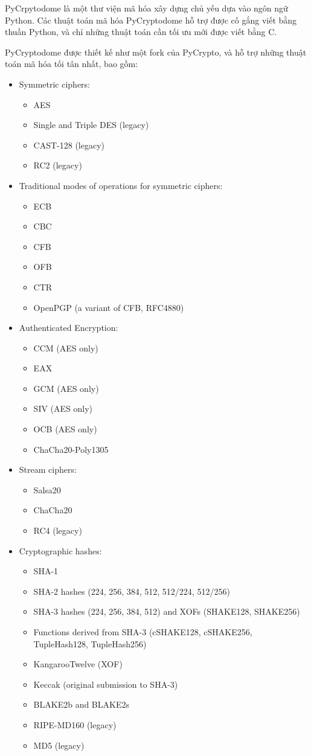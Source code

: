 \documentclass{article}
\begin{document}
PyCrpytodome là một thư viện mã hóa xây dựng chủ yếu dựa vào ngôn ngữ Python. Các thuật toán mã hóa PyCryptodome hỗ trợ được cố gắng viết bằng thuần Python, và chỉ những thuật toán cần tối ưu mới được viết bằng C.

PyCryptodome được thiết kế như một fork của PyCrypto, và hỗ trợ những thuật toán mã hóa tối tân nhất, bao gồm:
\begin{itemize}
\item Symmetric ciphers:
\begin{itemize}
    \item AES
    \item Single and Triple DES (legacy)
    \item CAST-128 (legacy)
    \item RC2 (legacy)
\end{itemize}
\item Traditional modes of operations for symmetric ciphers:
\begin{itemize}
    \item ECB
    \item CBC
    \item CFB
    \item OFB
    \item CTR
    \item OpenPGP (a variant of CFB, RFC4880)
\end{itemize}

\item Authenticated Encryption:
\begin{itemize}
\item CCM (AES only)
\item EAX
\item GCM (AES only)
\item SIV (AES only)
\item OCB (AES only)
\item ChaCha20-Poly1305
\end{itemize}

\item Stream ciphers:
\begin{itemize}
\item Salsa20
\item ChaCha20
\item RC4 (legacy)
\end{itemize}

\item Cryptographic hashes:
\begin{itemize}
\item SHA-1
\item SHA-2 hashes (224, 256, 384, 512, 512/224, 512/256)
\item SHA-3 hashes (224, 256, 384, 512) and XOFs (SHAKE128, SHAKE256)
\item Functions derived from SHA-3 (cSHAKE128, cSHAKE256, TupleHash128, TupleHash256)
\item KangarooTwelve (XOF)
\item Keccak (original submission to SHA-3)
\item BLAKE2b and BLAKE2s
\item RIPE-MD160 (legacy)
\item MD5 (legacy)
\end{itemize}


\end{itemize}
\end{document}
